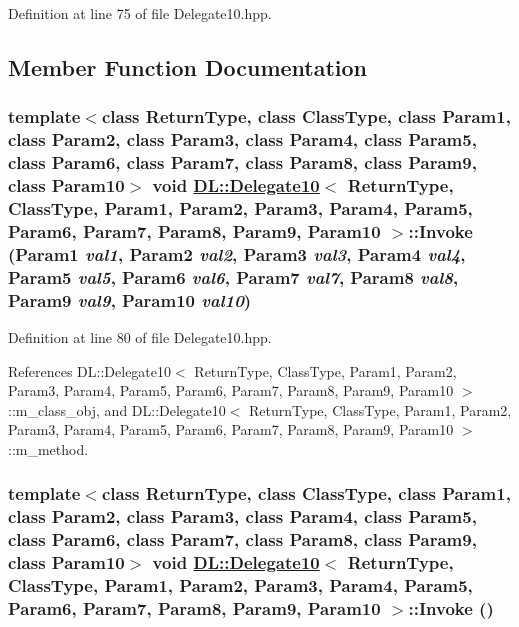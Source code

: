 Definition at line 75 of file Delegate10.hpp.

\subsection{Member Function Documentation}
\hypertarget{classDL_1_1Delegate10_a3}{
\subsubsection[Invoke]{\setlength{\rightskip}{0pt plus 5cm}template$<$class Return\-Type, class Class\-Type, class Param1, class Param2, class Param3, class Param4, class Param5, class Param6, class Param7, class Param8, class Param9, class Param10$>$ void \hyperlink{classDL_1_1Delegate10}{DL::Delegate10}$<$ Return\-Type, Class\-Type, Param1, Param2, Param3, Param4, Param5, Param6, Param7, Param8, Param9, Param10 $>$::Invoke (Param1 {\em val1}, Param2 {\em val2}, Param3 {\em val3}, Param4 {\em val4}, Param5 {\em val5}, Param6 {\em val6}, Param7 {\em val7}, Param8 {\em val8}, Param9 {\em val9}, Param10 {\em val10})}}
\label{classDL_1_1Delegate10_a3}




Definition at line 80 of file Delegate10.hpp.

References DL::Delegate10$<$ Return\-Type, Class\-Type, Param1, Param2, Param3, Param4, Param5, Param6, Param7, Param8, Param9, Param10 $>$::m\_\-class\_\-obj, and DL::Delegate10$<$ Return\-Type, Class\-Type, Param1, Param2, Param3, Param4, Param5, Param6, Param7, Param8, Param9, Param10 $>$::m\_\-method.\hypertarget{classDL_1_1Delegate10_a2}{
\subsubsection[Invoke]{\setlength{\rightskip}{0pt plus 5cm}template$<$class Return\-Type, class Class\-Type, class Param1, class Param2, class Param3, class Param4, class Param5, class Param6, class Param7, class Param8, class Param9, class Param10$>$ void \hyperlink{classDL_1_1Delegate10}{DL::Delegate10}$<$ Return\-Type, Class\-Type, Param1, Param2, Param3, Param4, Param5, Param6, Param7, Param8, Param9, Param10 $>$::Invoke ()}}
\label{classDL_1_1Delegate10_a2}





